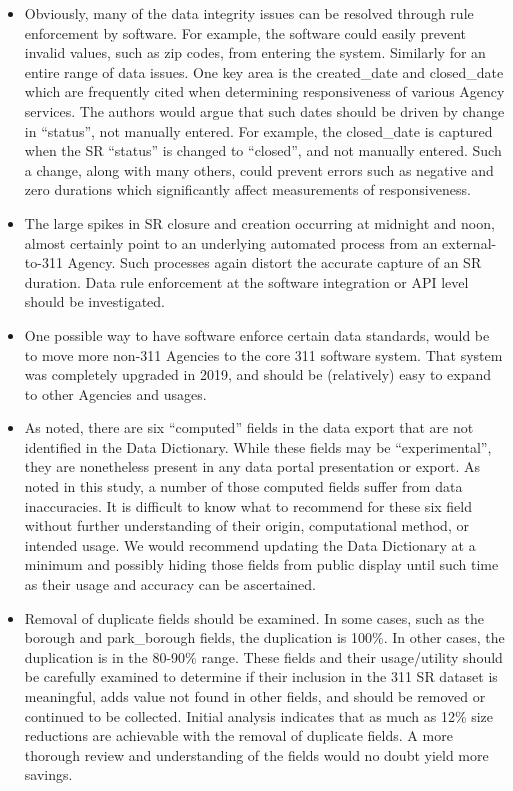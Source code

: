 \documentclass[12pt, titlepage]{article}
\begin{document}
{\begin{itemize}
	\item Obviously, many of the data integrity issues can be 
	resolved through rule enforcement by software. For example, the 
	software could easily prevent invalid values, such as zip codes, from 
	entering the system. Similarly for an entire range of data issues. One 
	key area is the created\_date and closed\_date which are frequently 
	cited when determining responsiveness of various Agency services. The 
	authors would argue that such dates should be driven by change 
	in ``status'', not manually entered. For example, the closed\_date 
	is captured when the SR ``status'' is changed to ``closed'', and 
	not manually entered. Such a change, along with many others, could 
	prevent errors such as negative and  zero durations which 
	significantly affect measurements of responsiveness. 
	
	\item The large spikes in SR closure and creation occurring at 
	midnight and noon, almost certainly point to an underlying automated 
	process from an external-to-311 Agency. Such processes again distort 
	the accurate capture of an SR duration. Data rule enforcement at the 
	software integration or API level should be investigated.

	\item One possible way to have software enforce certain data 
	standards, would be to move more non-311 Agencies to the core 
	311 software system. That system was completely upgraded in 
	2019, and should be (relatively) easy to expand to other 
	Agencies and usages.
	
	\item As noted, there are six ``computed'' fields in the data export 
	that are not identified in the Data Dictionary. While these fields may 
	be ``experimental'', they are nonetheless present in any data portal 
	presentation or export. As noted in this study, a number of those 
	computed fields suffer from data inaccuracies. It is difficult to know 
	what to recommend for these six field without further understanding of 
	their origin, computational method, or intended usage. We would 
	recommend updating the Data Dictionary at a minimum and 
	possibly hiding those fields from public display until such time as 
	their usage and accuracy can be ascertained.
	
	\item Removal of duplicate fields should be examined.  In some cases, such 
	as the borough and park\_borough fields, the duplication is 100\%. In 
	other cases, the duplication is in the 80-90\% range. These fields and 
	their usage/utility should be carefully examined to determine if 
	their inclusion in the 311 SR dataset is meaningful, adds value not found 
	in other fields, and should be removed or continued to be collected. Initial 
	analysis indicates that as much as 12\% size reductions are achievable 
	with the removal of duplicate fields. A more thorough review and 
	understanding of the fields would no doubt yield more savings. 
	

\end{itemize}}
\end{document}
